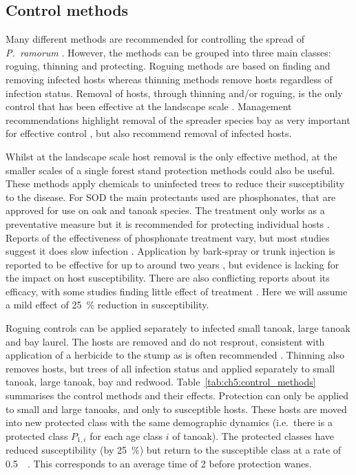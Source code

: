 \subsection{Control methods}

Many different methods are recommended for controlling the spread of \textit{P.~ramorum} \citep{swiecki_reference_2013}. However, the methods can be grouped into three main classes: roguing, thinning and protecting. Roguing methods are based on finding and removing infected hosts whereas thinning methods remove hosts regardless of infection status. Removal of hosts, through thinning and/or roguing, is the only control that has been effective at the landscape scale \citep{hansen_2008_epidemiology}. Management recommendations  highlight removal of the spreader species bay as very important for effective control \citep{swiecki_reference_2013}, but also recommend removal of infected hosts.

Whilst at the landscape scale host removal is the only effective method, at the smaller scales of a single forest stand protection methods could also be useful. These methods apply chemicals to uninfected trees to reduce their susceptibility to the disease. For SOD the main protectants used are phosphonates, that are approved for use on oak and tanoak species. The treatment only works as a preventative measure but it is recommended for protecting individual hosts \citep{lee_protecting_2010}. Reports of the effectiveness of phosphonate treatment vary, but most studies suggest it does slow infection \citep{swiecki_reference_2013}. Application by bark-spray or trunk injection is reported to be effective for up to around two years \citep{garbelotto_phosphonate_2009}, but evidence is lacking for the impact on host susceptibility. There are also conflicting reports about its efficacy, with some studies finding little effect of treatment \citep{kanaskie_application_2011}. Here we will assume a mild effect of \SI{25}{\percent} reduction in susceptibility.

Roguing controls can be applied separately to infected small tanoak, large tanoak and bay laurel. The hosts are removed and do not resprout, consistent with application of a herbicide to the stump as is often recommended \citep{swiecki_reference_2013}. Thinning also removes hosts, but trees of all infection status and applied separately to small tanoak, large tanoak, bay and redwood. Table~\ref{tab:ch5:control_methods} summarises the control methods and their effects. Protection can only be applied to small and large tanoaks, and only to susceptible hosts. These hosts are moved into new protected class with the same demographic dynamics (i.e.\ there is a protected class $P_{1,i}$ for each age class $i$ of tanoak). The protected classes have reduced susceptibility (by \SI{25}{\percent}) but return to the susceptible class at a rate of \SI{0.5}{\per\year}. This corresponds to an average time of \SI{2}{\years} before protection wanes.

